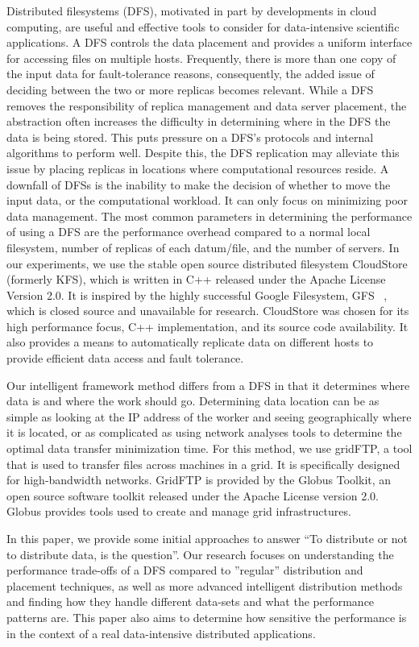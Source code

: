 \documentclass{rspublic}
\begin{document}
Distributed filesystems (DFS), motivated in part by developments in
cloud computing, are useful and effective tools to consider for
data-intensive scientific applications. A DFS controls the data
placement and provides a uniform interface for accessing files on
multiple hosts. Frequently, there is more than one copy of the input
data for fault-tolerance reasons, consequently, the added issue of
deciding between the two or more replicas becomes relevant. While a DFS
removes the responsibility of replica management and data server
placement, the abstraction often increases the difficulty in determining
where in the DFS the data is being stored. This puts pressure on a
DFS's protocols and internal algorithms to perform well. Despite this,
the DFS replication may alleviate this issue by placing replicas in
locations where computational resources reside. A downfall of DFSs is
the inability to make the decision of whether to move the input data, or
the computational workload. It can only focus on minimizing poor data
management. The most common parameters in determining the performance of
using a DFS are the performance overhead compared to a normal local
filesystem, number of replicas of each datum/file, and the number of
servers. In our experiments, we use the stable open source distributed
filesystem CloudStore (formerly KFS), which is written in C++ released
under the Apache License Version 2.0. It is inspired by the highly
successful Google Filesystem, GFS ~\citep{cloudstore_web}, which is
closed source and unavailable for research. CloudStore was chosen for
its high performance focus, C++ implementation, and its source code
availability. It also provides a means to automatically replicate data
on different hosts to provide efficient data access and fault tolerance. 

Our intelligent framework method differs from a DFS in that it
determines where data is and where the work should go. 
Determining data location can be as simple as
looking at the IP address of the worker and seeing geographically where
it is located, or as complicated as using network analyses tools to
determine the optimal data transfer minimization time. 
For this method, we use gridFTP, a tool that is used to transfer
files across machines in a grid. It is
specifically designed for high-bandwidth networks. GridFTP is provided by
the Globus Toolkit, an open source software toolkit
released under the Apache License version 2.0. Globus provides tools used
to create and manage grid infrastructures. 

In this paper, we provide some initial approaches to answer ``To
distribute or not to distribute data, is the question''. Our research
focuses on understanding the performance trade-offs of a DFS compared to
''regular'' distribution and placement techniques, as well as more
advanced intelligent distribution methods and finding how they handle
different data-sets and what the performance patterns are. This paper
also aims to determine how sensitive the performance is in the context
of a real data-intensive distributed applications.
\end{document}
